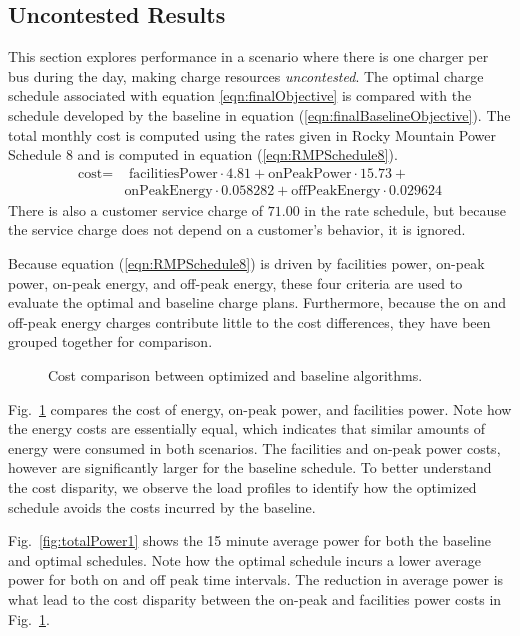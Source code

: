 \subsection{Uncontested Results}
This section explores performance in a scenario where there is one charger per bus during the day, making charge resources \textit{uncontested}. The optimal charge schedule associated with equation \ref{eqn:finalObjective} is compared with the schedule developed by the baseline in equation (\ref{eqn:finalBaselineObjective}). The total monthly cost is computed using the rates given in Rocky Mountain Power Schedule 8 and is computed in equation (\ref{eqn:RMPSchedule8}).
	\begin{equation}\label{eqn:RMPSchedule8}
		\begin{aligned}
			\text{cost} = & \text{ facilitiesPower}\cdot 4.81 + \text{onPeakPower}\cdot 15.73 + \\ 
			& \text{onPeakEnergy}\cdot 0.058282 + \text{offPeakEnergy}\cdot 0.029624
		\end{aligned}
	\end{equation}
	There is also a customer service charge of $71.00$ in the rate schedule, but because the service charge does not depend on a customer's behavior, it is ignored.
\par Because equation (\ref{eqn:RMPSchedule8}) is driven by facilities power, on-peak power, on-peak energy, and off-peak energy, these four criteria are used to evaluate the optimal and baseline charge plans.  Furthermore, because the on and off-peak energy charges contribute little to the cost differences, they have been grouped together for comparison.
\begin{figure}
	\centering
	\caption{Cost comparison between optimized and baseline algorithms.}
	\label{fig:costComparison}
\end{figure}
\par  Fig.~\ref{fig:costComparison} compares the cost of energy, on-peak power, and facilities power. Note how the energy costs are essentially equal, which indicates that similar amounts of energy were consumed in both scenarios. The facilities and on-peak power costs, however are significantly larger for the baseline schedule. To better understand the cost disparity, we observe the load profiles to identify how the optimized schedule avoids the costs incurred by the baseline.
\par Fig.~\ref{fig:totalPower1} shows the 15 minute average power for both the baseline and optimal schedules. Note how the optimal schedule incurs a lower average power for both on and off peak time intervals. The reduction in average power is what lead to the cost disparity between the on-peak and facilities power costs in Fig.~\ref{fig:costComparison}. 

